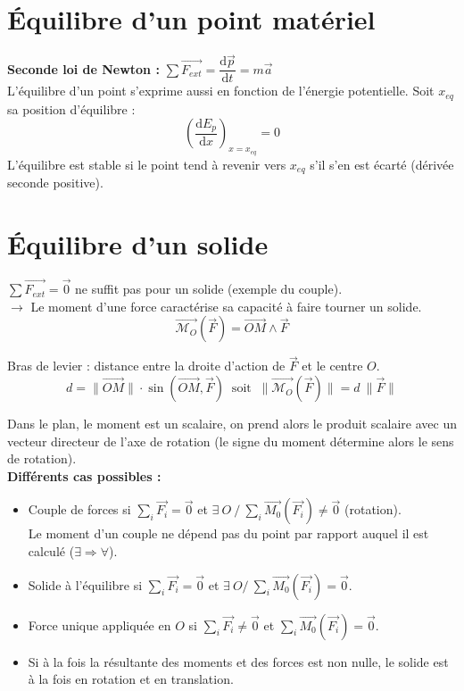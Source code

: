 \documentclass[13pt, twoside, a4paper, french]{report}
\begin{document}
    \section{Équilibre d'un point matériel}\label{sec:equilibre-d'un-point-materiel}

        \textbf{Seconde loi de Newton : } $\sum \overrightarrow{F_{ext}} = \dfrac{\textrm{d}\vec{p}}{\textrm{d}t} = m \vec{a}$\\
        L'équilibre d'un point s'exprime aussi en fonction de l'énergie potentielle.
        Soit $x_{eq}$ sa position d'équilibre :
        \[ \left( \dfrac{\textrm{d}E_p}{\textrm{d}x}\right) _{x=x_{eq}} = 0\]
        L'équilibre est stable si le point tend à revenir vers $x_{eq}$ s'il s'en est écarté (dérivée seconde positive).


    \section{Équilibre d'un solide}\label{sec:equilibre-d-un-solide}

        $\sum \overrightarrow{F_{ext}} = \vec{0}$ ne suffit pas pour un solide (exemple du couple).\\
        $\rightarrow$ Le moment d'une force caractérise sa capacité à faire tourner un solide.
        \[ \overrightarrow{\mathcal{M}_O}(\overrightarrow{F}) = \overrightarrow{OM} \land \overrightarrow{F} \]

        Bras de levier : distance entre la droite d'action de $\overrightarrow{F}$ et le centre $O$.
        \[ d = \|\overrightarrow{OM}\| \cdot \sin(\overrightarrow{OM}, \overrightarrow{F}) \;\; \text{soit} \;\; \|\overrightarrow{\mathcal{M}_O}(\overrightarrow{F})\| = d\ \|\overrightarrow{F}\| \]

        Dans le plan, le moment est un scalaire, on prend alors le produit scalaire avec un vecteur directeur de l'axe de rotation (le signe du moment détermine alors le sens de rotation).\\

        \textbf{Différents cas possibles :}
        \begin{itemize}
            \item Couple de forces si $\sum_i \overrightarrow{F_i} = \vec 0$ et $\exists\ O\ /\ \sum_i \overrightarrow{M_0}(\overrightarrow{F_i}) \neq \vec 0$ (rotation).\\Le moment d’un couple ne dépend pas du point par rapport auquel il est calculé ($\exists \Rightarrow \forall$).
            \item Solide à l'équilibre si $\sum_i \overrightarrow{F_i} = \vec 0$ et $\exists\ O /\ \sum_i \overrightarrow{M_0}(\overrightarrow{F_i}) = \vec 0$.
            \item Force unique appliquée en $O$ si $\sum_i \overrightarrow{F_i} \neq \vec 0$ et $\sum_i \overrightarrow{M_0}(\overrightarrow{F_i}) = \vec 0$.
            \item Si à la fois la résultante des moments et des forces est non nulle, le solide est à la fois en rotation et en translation.
        \end{itemize}
\end{document}
